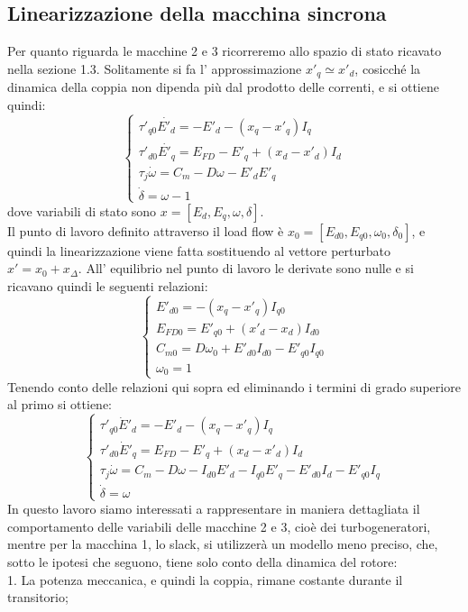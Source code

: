 \documentclass[Lau,noexaminfo]{sapthesis}
\begin{document}
	\subsection{Linearizzazione della macchina sincrona}
	Per quanto riguarda le macchine 2 e 3 ricorreremo allo spazio di stato ricavato nella sezione 1.3. Solitamente si fa l' approssimazione $x'_q\simeq x'_d$, cosicché la dinamica della coppia non dipenda più dal prodotto delle correnti, e si ottiene quindi:
	\[
	\begin{cases}
	\tau'_{q0} \dot{E'_d}=-E'_d-(x_q-x'_q)I_q\\
	\tau'_{d0}\dot{E'_q}=E_{FD}-E'_q+(x_d-x'_d)I_d\\
	\tau_j\dot{\omega}=C_m-D\omega-E'_dE'_q\\
	\dot{\delta}=\omega-1
	\end{cases}
	\]
	dove variabili di stato sono $x=[E_d,E_q,\omega,\delta]$.\\
	Il punto di lavoro definito attraverso il load flow è $x_0=[E_{d0},E_{q0},\omega_0,\delta_0]$, e quindi la linearizzazione viene fatta sostituendo al vettore perturbato \\$x'=x_0+x_\Delta$. All' equilibrio nel punto di lavoro le derivate sono nulle e si ricavano quindi le seguenti relazioni:\\
	\[
	\begin{cases}
	E'_{d0}=-(x_q-x'_q)I_{q0}\\
	E_{FD0}=E'_{q0}+(x'_d-x_d)I_{d0}\\
	C_{m0}=D\omega_0+E'_{d0}I_{d0}-E'_{q0}I_{q0}\\
	\omega_0=1
	\end{cases}
	\]
	Tenendo conto delle relazioni qui sopra ed eliminando i termini di grado superiore al primo si ottiene:
	\[
	\begin{cases}
	\tau'_{q0}\dot{E}'_d= -E'_d-(x_q-x'_q)I_q\\
	\tau'_{d0}\dot{E}'_q=E_{FD}-E'_q+(x_d-x'_d)I_d\\
	\tau_j\dot{\omega}=C_m-D\omega-I_{d0}E'_d-I_{q0}E'_q-E'_{d0}I_d-E'_{q0}I_q\\
	\dot{\delta}=\omega
	\end{cases}
	\]
	In questo lavoro siamo interessati a rappresentare in maniera dettagliata il comportamento delle variabili delle macchine 2 e 3, cioè dei turbogeneratori, mentre per la macchina 1, lo slack, si utilizzerà un modello meno preciso, che, sotto le ipotesi che seguono, tiene solo conto della dinamica del rotore:\\
	1. La potenza meccanica, e quindi la coppia, rimane costante durante il transitorio;\\
\end{document}
